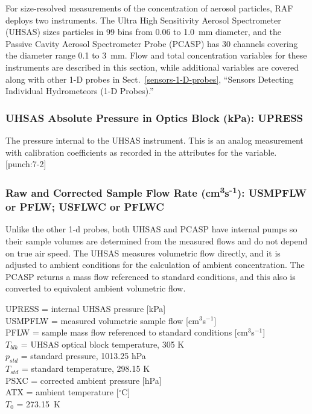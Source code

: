 \documentclass[
  english,
]{book}
\newcommand{\textgreek}[2][]{\foreignlanguage{greek}{#2}}
\begin{document}
For size-resolved measurements of the concentration of aerosol particles, RAF deploys two instruments. The Ultra High Sensitivity Aerosol Spectrometer (UHSAS) sizes particles in 99 bins from 0.06 to 1.0~\textgreek{m}m diameter, and the Passive Cavity Aerosol Spectrometer Probe (PCASP) has 30 channels covering the diameter range 0.1 to 3~\textgreek{m}m. Flow and total concentration variables for these instruments are described in this section, while additional variables are covered along with other 1-D probes in Sect.~\ref{sensors-1-D-probes}, ``Sensors Detecting Individual Hydrometeors (1-D Probes).''

\hypertarget{upress}{%
\subsubsection*{UHSAS Absolute Pressure in Optics Block (kPa): UPRESS}\label{upress}}

The pressure internal to the UHSAS instrument. This is an analog measurement with calibration coefficients as recorded in the attributes for the variable.\protect\hypertarget{punch:7-2}{}{{[}punch:7-2{]}}

\hypertarget{pflw}{%
\subsubsection*{\texorpdfstring{Raw and Corrected Sample Flow Rate (cm\textsuperscript{3}s\textsuperscript{-1}): USMPFLW or PFLW; USFLWC or PFLWC}{Raw and Corrected Sample Flow Rate (cm3s-1): USMPFLW or PFLW; USFLWC or PFLWC}}\label{pflw}}

Unlike the other 1-d probes, both UHSAS and PCASP have internal pumps so their sample volumes are determined from the measured flows and do not depend on true air speed. The UHSAS measures volumetric flow directly, and it is adjusted to ambient conditions for the calculation of ambient concentration. The PCASP returns a mass flow referenced to standard conditions, and this also is converted to equivalent ambient volumetric flow.

UPRESS = internal UHSAS pressure {[}kPa{]}\\
USMPFLW = measured volumetric sample flow {[}cm\(^{3}\)s\(^{-1}\){]}\\
PFLW = sample mass flow referenced to standard conditions {[}cm\(^{3}\)s\(^{-1}\){]}\\
\(T_{blk}\) = UHSAS optical block temperature, 305 K\\
\(p_{std}\) = standard pressure, 1013.25 hPa\\
\(T_{std}\) = standard temperature, 298.15 K\\
PSXC = corrected ambient pressure {[}hPa{]}\\
ATX = ambient temperature {[}\(^{\circ}\)C{]}\\
\(T_{0}\) = 273.15~K
\end{document}
